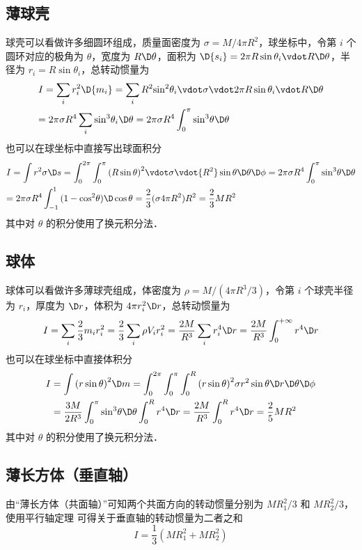 \subsection{薄球壳}
球壳可以看做许多细圆环组成，质量面密度为 $\sigma  = M/4\pi {R^2}$，球坐标中，令第 $i$ 个圆环对应的极角为 $\theta$，宽度为 $R\D \theta$，面积为 $\D{s_i} = 2\pi R\sin {\theta _i} \vdot R\D\theta$，半径为 ${r_i} = R\sin {\theta _i}$，总转动惯量为
\begin{equation}\label{ExMI_star}
\begin{gathered}
  I = \sum\limits_i {r_i^2\D{m_i}}  = \sum\limits_i {{R^2}{{\sin }^2}{\theta _i} \vdot \sigma  \vdot 2\pi R\sin {\theta _i} \vdot R\D\theta }  \hfill \\
   = 2\pi \sigma {R^4}\sum\limits_i {{{\sin }^3}{\theta _i}\D\theta }  = 2\pi \sigma {R^4}\int_0^\pi  {{{\sin }^3}\theta \D\theta }  \hfill \\ 
\end{gathered}
\end{equation}
也可以在球坐标中直接写出球面积分
\begin{equation}
\begin{gathered}
  I = \int {{r^2}\sigma \D s}  = \int_0^{2\pi } {\int_0^\pi  {{{(R\sin \theta )}^2} \vdot \sigma  \vdot {R^2}\sin \theta \D\theta \D\phi } }  = 2\pi \sigma {R^4}\int_0^\pi  {{{\sin }^3}\theta \D\theta }  \hfill \\
   = 2\pi \sigma {R^4}\int_{ - 1}^1 {(1 - {{\cos }^2}\theta )\D\cos \theta }  = \frac{2}{3}(\sigma 4\pi {R^2}){R^2} = \frac{2}{3}M{R^2} \hfill \\ 
\end{gathered}
\end{equation}
其中对 $\theta$ 的积分使用了换元积分法．%

\subsection{球体}
球体可以看做许多薄球壳组成，体密度为 $\rho  = M/(4\pi {R^3}/3)$，令第 $i$ 个球壳半径为 $r_i$，厚度为 $\D r$，体积为 $4\pi r_i^2\D r$，总转动惯量为
\begin{equation}
I = \sum\limits_i {\frac{2}{3}{m_i}r_i^2}  = \frac{2}{3}\sum\limits_i {\rho {V_i}r_i^2}  = \frac{2M}{R^3}\sum\limits_i {r_i^4\D r}  = \frac{2M}{R^3}\int_0^{ + \infty } {{r^4}\D r}
\end{equation}
也可以在球坐标中直接体积分
\begin{equation}
\begin{aligned}
I &= \int {{{(r\sin \theta )}^2}\D m}  = \int_0^{2\pi } {\int_0^\pi  {\int_0^R {{{(r\sin \theta )}^2}\sigma {r^2}\sin \theta \D r\D\theta \D\phi } } } \\
&= \frac{3M}{2R^3}\int_0^\pi  {{{\sin }^3}\theta \D\theta } \int_0^R {{r^4}\D r}  =\frac{2M}{R^3}\int_0^R {{r^4}\D r}  = \frac{2}{5}M{R^2}
\end{aligned}
\end{equation}
其中对 $\theta$ 的积分使用了换元积分法．%

\subsection{薄长方体（垂直轴）}
由“薄长方体（共面轴）”可知两个共面方向的转动惯量分别为 $MR_1^2/3$ 和 $MR_2^2/3$，使用平行轴定理%
可得关于垂直轴的转动惯量为二者之和
\begin{equation}
I = \frac{1}{3} (MR_1^2+MR_2^2)
\end{equation}